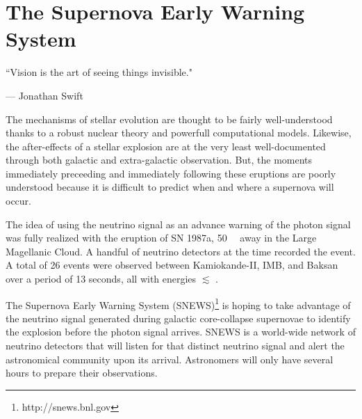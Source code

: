 %
%
%
%


\chapter{The Supernova Early Warning System}
	\label{snews_chapter}
	\vspace{-0.2in}

	\begin{quoting}
		\noindent \large ``Vision is the art of seeing things invisible." \normalsize

		--- Jonathan Swift
	\end{quoting}

	 The mechanisms of stellar evolution are thought to be fairly well-understood thanks to a robust nuclear theory and powerfull computational models. Likewise, the after-effects of a stellar explosion are at the very least well-documented through both galactic and extra-galactic observation. But, the moments immediately preceeding and immediately following these eruptions are poorly understood because it is difficult to predict when and where a supernova will occur. 

	The idea of using the neutrino signal as an advance warning of the photon signal was fully realized with the eruption of SN 1987a, \SI{50}{\kilo\parsec} away in the Large Magellanic Cloud. A handful of neutrino detectors at the time recorded the event\cite{kii1987a,imb_1987a,baksan1987a}. A total of 26 events were observed between Kamiokande-II, IMB, and Baksan over a period of 13 seconds, all with energies $\lesssim$ \nolinebreak {}.

	The Supernova Early Warning System (SNEWS)\footnote{http://snews.bnl.gov} is hoping to take advantage of the neutrino signal generated during galactic core-collapse supernovae to identify the explosion before the photon signal arrives. SNEWS is a world-wide network of neutrino detectors that will listen for that distinct neutrino signal and alert the astronomical community upon its arrival. Astronomers will only have several hours to prepare their observations. 



